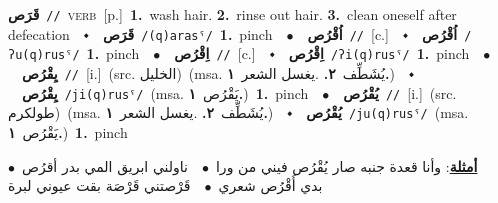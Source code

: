 \documentclass[10pt,a4paper,twoside]{article} %
\begin{document}
\begin{multicols}{2}
{\setlength\topsep{0pt}\textbf{\foreignlanguage{arabic}{قَرَص}}\ {\color{gray}\texttt{//}\color{black}}\ \textsc{verb}\ [p.]\ \textbf{1.}~wash hair.  \textbf{2.}~rinse out hair.  \textbf{3.}~clean oneself after defecation\ \ $\smblkdiamond$\ \ \setlength\topsep{0pt}\textbf{\foreignlanguage{arabic}{قَرَص}}\ {\color{gray}\texttt{/(q)arasˤ/}\color{black}}\ \textbf{1.}~pinch\ \ $\bullet$\ \ \setlength\topsep{0pt}\textbf{\foreignlanguage{arabic}{اُقْرُص}}\ {\color{gray}\texttt{//}\color{black}}\ [c.]\ \ $\smblkdiamond$\ \ \setlength\topsep{0pt}\textbf{\foreignlanguage{arabic}{اُقْرُص}}\ {\color{gray}\texttt{/ʔu(q)rusˤ/}\color{black}}\ \textbf{1.}~pinch\ \ $\bullet$\ \ \setlength\topsep{0pt}\textbf{\foreignlanguage{arabic}{اِقْرُص}}\ {\color{gray}\texttt{//}\color{black}}\ [c.]\ \ $\smblkdiamond$\ \ \setlength\topsep{0pt}\textbf{\foreignlanguage{arabic}{اِقْرُص}}\ {\color{gray}\texttt{/ʔi(q)rusˤ/}\color{black}}\ \textbf{1.}~pinch\ \ $\bullet$\ \ \setlength\topsep{0pt}\textbf{\foreignlanguage{arabic}{يِقْرُص}}\ {\color{gray}\texttt{//}\color{black}}\ [i.]\ (src. \color{gray}\foreignlanguage{arabic}{الخليل}\color{black})\ \color{gray}(msa. \foreignlanguage{arabic}{يُشَطِّف}~\foreignlanguage{arabic}{\textbf{٢.}}  .\foreignlanguage{arabic}{يغسل الشعر}~\foreignlanguage{arabic}{\textbf{١.}})\color{black}\ \ $\smblkdiamond$\ \ \setlength\topsep{0pt}\textbf{\foreignlanguage{arabic}{يِقْرُص}}\ {\color{gray}\texttt{/ji(q)rusˤ/}\color{black}}\ \color{gray}(msa. \foreignlanguage{arabic}{يَقْرُص}~\foreignlanguage{arabic}{\textbf{١.}})\color{black}\ \textbf{1.}~pinch\ \ $\bullet$\ \ \setlength\topsep{0pt}\textbf{\foreignlanguage{arabic}{يُقْرُص}}\ {\color{gray}\texttt{//}\color{black}}\ [i.]\ (src. \color{gray}\foreignlanguage{arabic}{طولكرم}\color{black})\ \color{gray}(msa. \foreignlanguage{arabic}{يُشَطِّف}~\foreignlanguage{arabic}{\textbf{٢.}}  .\foreignlanguage{arabic}{يغسل الشعر}~\foreignlanguage{arabic}{\textbf{١.}})\color{black}\ \ $\smblkdiamond$\ \ \setlength\topsep{0pt}\textbf{\foreignlanguage{arabic}{يُقْرُص}}\ {\color{gray}\texttt{/ju(q)rusˤ/}\color{black}}\ \color{gray}(msa. \foreignlanguage{arabic}{يَقْرُص}~\foreignlanguage{arabic}{\textbf{١.}})\color{black}\ \textbf{1.}~pinch\  \begin{flushright}\color{gray}\foreignlanguage{arabic}{\textbf{\underline{\foreignlanguage{arabic}{أمثلة}}}: وأنا قعدة جنبه صار يُقْرُص فيني من ورا\ $\bullet$\ \  ناولني ابريق المي بدر أقرُص\ $\bullet$\ \  بدي أَقْرُص شعري\ $\bullet$\ \  قَرْصتني قَرْصَة بقت عيوني لبرة}\end{flushright}\color{black}} \vspace{2mm}


\end{multicols}
\end{document}

